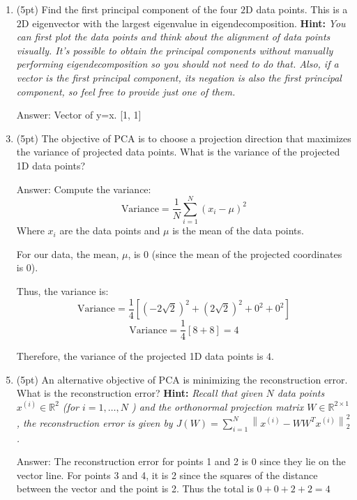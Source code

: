 \documentclass[10pt, a4paper]{article}
\begin{document}
\begin{enumerate}[label = \arabic*.]
  \item (5pt) Find the first principal component of the four $2 \mathrm{D}$ data points. This is a $2 \mathrm{D}$ eigenvector with the largest eigenvalue in eigendecomposition. \textbf{Hint:} \textit{You can first plot the data points and think about the alignment of data points visually. It's possible to obtain the principal components without manually performing eigendecomposition so you should not need to do that. Also, if a vector is the first principal component, its negation is also the first principal component, so feel free to provide just one of them.}

  \item[Answer:] Vector of y=x. [1, 1]

  \item (5pt) The objective of PCA is to choose a projection direction that maximizes the variance of projected data points. What is the variance of the projected 1D data points?

  \item[Answer:] Compute the variance:
\[ \text{Variance} = \frac{1}{N} \sum_{i=1}^{N} (x_i - \mu)^2 \]
Where \(x_i\) are the data points and \(\mu\) is the mean of the data points.

For our data, the mean, \(\mu\), is 0 (since the mean of the projected coordinates is 0).

Thus, the variance is:
\[ \text{Variance} = \frac{1}{4} [(-2\sqrt{2})^2 + (2\sqrt{2})^2 + 0^2 + 0^2] \]
\[ \text{Variance} = \frac{1}{4} [8 + 8] = 4 \]

Therefore, the variance of the projected 1D data points is \(4\).

  \item (5pt) An alternative objective of PCA is minimizing the reconstruction error. What is the reconstruction error? \textbf{Hint:} \textit{Recall that given $N$ data points $x^{(i)} \in \mathbb{R}^{2}$ (for $i=1, \ldots, N$ ) and the orthonormal projection matrix $W \in \mathbb{R}^{2 \times 1}$, the reconstruction error is given by $J(W)=\sum_{i=1}^{N}\left\|x^{(i)}-W W^{T} x^{(i)}\right\|_{2}^{2}$.}

  \item[Answer:] The reconstruction error for points 1 and 2 is 0 since they lie on the vector line. For points 3 and 4, it is 2 since the squares of the distance between the vector and the point is 2. Thus the total is $0 + 0 + 2 + 2 = 4$

\end{enumerate}
\end{document}
